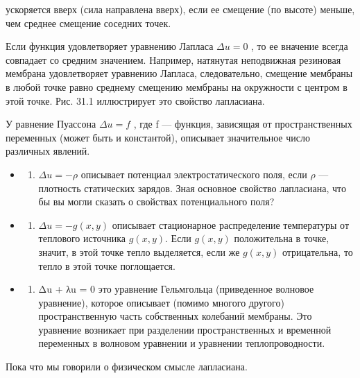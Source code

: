 \documentclass[
  ukrainian,
]{article}
\providecommand{\tightlist}{%
  \setlength{\itemsep}{0pt}\setlength{\parskip}{0pt}}
\begin{document}
ускоряется вверх (сила направлена вверх), если ее смещение (по высоте)
меньше, чем среднее смещение соседних точек.

Если функция удовлетворяет уравнению Лапласа \(\Delta u=0\) , то ее
вначение всегда совпадает со средним значением. Например, натянутая
неподвижная резиновая мембрана удовлетворяет уравнению Лапласа,
следовательно, смещение мембраны в любой точке равно среднему смещению
мембраны на окружности с центром в этой точке. Рис. 31.1 иллюстрирует
это свойство лапласиана.

У равнение Пуассона \(\Delta u = f\) , где f --- функция, зависящая от
пространственных переменных (может быть и константой), описывает
значительное число различных явлений.

\begin{itemize}
\tightlist
\item
  \begin{enumerate}
  \def\labelenumi{\arabic{enumi}.}
  \tightlist
  \item
    \(\Delta u = -\rho\) описывает потенциал электростатического поля,
    если \(\rho\) ---плотность статических зарядов. Зная основное
    свойство лапласиана, что бы вы могли сказать о свойствах
    потенциального поля?
  \end{enumerate}
\item
  \begin{enumerate}
  \def\labelenumi{\arabic{enumi}.}
  \setcounter{enumi}{1}
  \tightlist
  \item
    \(\Delta u = -g(x, y)\) описывает стационарное распределение
    температуры от теплового источника \(g(x, y)\). Если \(g(x, y)\)
    положительна в точке, значит, в этой точке тепло выделяется, если же
    \(g(x, y)\) отрицательна, то тепло в этой точке поглощается.
  \end{enumerate}
\item
  \begin{enumerate}
  \def\labelenumi{\arabic{enumi}.}
  \setcounter{enumi}{2}
  \tightlist
  \item
    Δu + λu = 0 это уравнение Гельмгольца (приведенное волновое
    уравнение), которое описывает (помимо многого другого)
    пространственную часть собственных колебаний мембраны. Это уравнение
    возникает при разделении пространственных и временной переменных в
    волновом уравнении и уравнении теплопроводности.
  \end{enumerate}
\end{itemize}

Пока что мы говорили о физическом смысле лапласиана.
\end{document}
